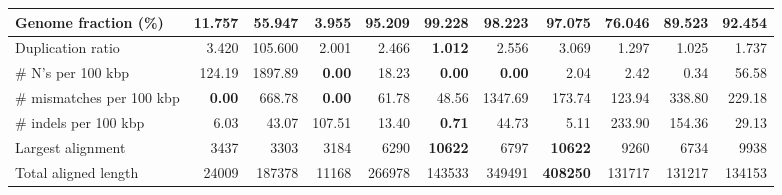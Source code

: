 \documentclass[12pt,a4paper]{article}
\begin{document}
\begin{table}[ht]
\begin{center}
\begin{tabular}{|l*{10}{|r}|}
Genome fraction (\%) & 11.757 & 55.947 & 3.955 & 95.209 & {\bf 99.228} & 98.223 & 97.075 & 76.046 & 89.523 & 92.454 \\ \hline
Duplication ratio & 3.420 & 105.600 & 2.001 & 2.466 & {\bf 1.012} & 2.556 & 3.069 & 1.297 & 1.025 & 1.737 \\ \hline
\# N's per 100 kbp & 124.19 & 1897.89 & {\bf 0.00} & 18.23 & {\bf 0.00} & {\bf 0.00} & 2.04 & 2.42 & 0.34 & 56.58 \\ \hline
\# mismatches per 100 kbp & {\bf 0.00} & 668.78 & {\bf 0.00} & 61.78 & 48.56 & 1347.69 & 173.74 & 123.94 & 338.80 & 229.18 \\ \hline
\# indels per 100 kbp & 6.03 & 43.07 & 107.51 & 13.40 & {\bf 0.71} & 44.73 & 5.11 & 233.90 & 154.36 & 29.13 \\ \hline
Largest alignment & 3437 & 3303 & 3184 & 6290 & {\bf 10622} & 6797 & {\bf 10622} & 9260 & 6734 & 9938 \\ \hline
Total aligned length & 24009 & 187378 & 11168 & 266978 & 143533 & 349491 & {\bf 408250} & 131717 & 131217 & 134153 \\ \hline
\end{tabular}
\end{center}
\end{table}
\end{document}

